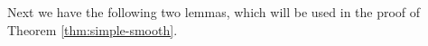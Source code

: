 \documentclass[a4paper,12pt,reqno]{amsart}
\theoremstyle{question}
\theoremstyle{definition}
\theoremstyle{remark}
\theoremstyle{cited}
\theoremstyle{citeddef}
\def\phi{{\varphi}}
\begin{document}

     
     

    
    


Next we have the following two lemmas, which will be used in the proof of Theorem \ref{thm:simple-smooth}.
\end{document}
